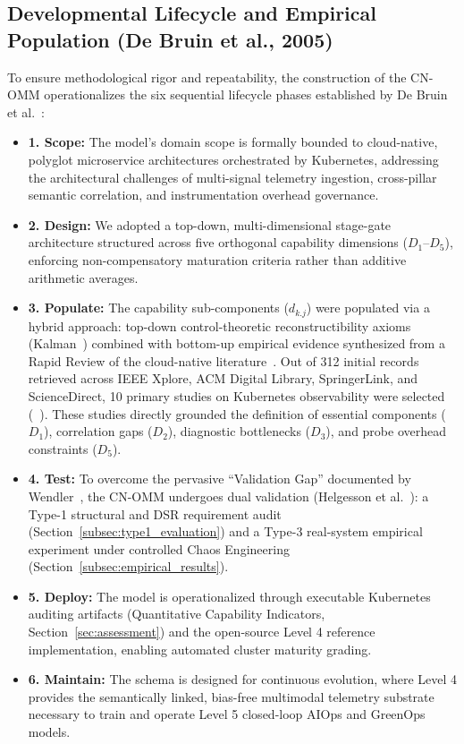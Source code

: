 \subsection{Developmental Lifecycle and Empirical Population (De Bruin et al., 2005)}
\label{subsec:debruin_lifecycle}

To ensure methodological rigor and repeatability, the construction of the CN-OMM operationalizes the six sequential lifecycle phases established by De Bruin et al.~\cite{debruin_2005}:
\begin{itemize}[leftmargin=*, nosep]
    \item \textbf{1. Scope:} The model's domain scope is formally bounded to cloud-native, polyglot microservice architectures orchestrated by Kubernetes, addressing the architectural challenges of multi-signal telemetry ingestion, cross-pillar semantic correlation, and instrumentation overhead governance.
    \item \textbf{2. Design:} We adopted a top-down, multi-dimensional stage-gate architecture structured across five orthogonal capability dimensions ($D_1$--$D_5$), enforcing non-compensatory maturation criteria rather than additive arithmetic averages.
    \item \textbf{3. Populate:} The capability sub-components ($d_{k.j}$) were populated via a hybrid approach: top-down control-theoretic reconstructibility axioms (Kalman~\cite{kalman_1960}) combined with bottom-up empirical evidence synthesized from a Rapid Review of the cloud-native literature~\cite{cartaxo_2018}. Out of 312 initial records retrieved across IEEE Xplore, ACM Digital Library, SpringerLink, and ScienceDirect, 10 primary studies on Kubernetes observability were selected (~\cite{kosinska_2023, usman_2022, faseeha_2025, araujo_2024, hartikainen_2024, gomes_2025, han_2024, deng_2024, zanatta_23, wei_2025}). These studies directly grounded the definition of essential components ($D_1$), correlation gaps ($D_2$), diagnostic bottlenecks ($D_3$), and probe overhead constraints ($D_5$).
    \item \textbf{4. Test:} To overcome the pervasive ``Validation Gap'' documented by Wendler~\cite{wendler_2012}, the CN-OMM undergoes dual validation (Helgesson et al.~\cite{helgesson_2012}): a Type-1 structural and DSR requirement audit (Section~\ref{subsec:type1_evaluation}) and a Type-3 real-system empirical experiment under controlled Chaos Engineering (Section~\ref{subsec:empirical_results}).
    \item \textbf{5. Deploy:} The model is operationalized through executable Kubernetes auditing artifacts (Quantitative Capability Indicators, Section~\ref{sec:assessment}) and the open-source Level 4 reference implementation, enabling automated cluster maturity grading.
    \item \textbf{6. Maintain:} The schema is designed for continuous evolution, where Level 4 provides the semantically linked, bias-free multimodal telemetry substrate necessary to train and operate Level 5 closed-loop AIOps and GreenOps models.
\end{itemize}
